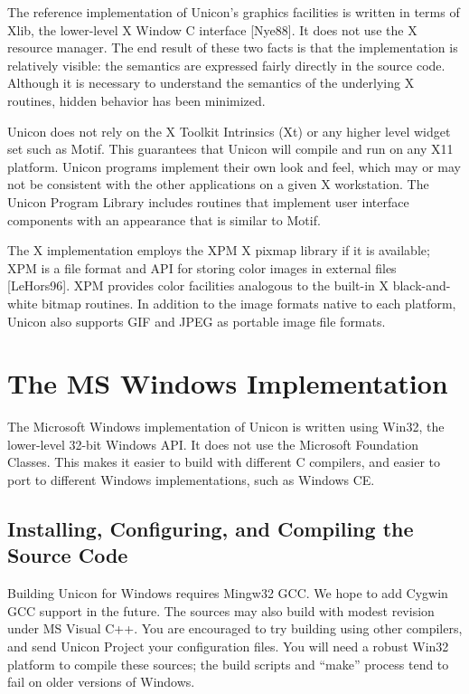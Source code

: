 The reference implementation of Unicon's graphics facilities is
written in terms of Xlib, the lower-level X Window C interface
[Nye88]. It does not use the X resource manager. The end result of
these two facts is that the implementation is relatively visible: the
semantics are expressed fairly directly in the source code. Although
it is necessary to understand the semantics of the underlying X
routines, hidden behavior has been minimized.

Unicon does not rely on the X Toolkit Intrinsics (Xt) or any higher
level widget set such as Motif. This guarantees that Unicon will
compile and run on any X11 platform. Unicon programs implement their
own look and feel, which may or may not be consistent with the other
applications on a given X workstation. The Unicon Program Library
includes routines that implement user interface components with an
appearance that is similar to Motif.

The X implementation employs the XPM X pixmap library if it is
available; XPM is a file format and API for storing color
images in external files [LeHors96]. XPM provides color facilities
analogous to the built-in X black-and-white bitmap routines. In
addition to the image formats native to each platform, Unicon also
supports GIF and JPEG as portable image file formats.

\section{The MS Windows Implementation}

The Microsoft Windows implementation of Unicon is written using Win32,
the lower-level 32-bit Windows API. It does not use the Microsoft
Foundation Classes. This makes it easier to build with different C
compilers, and easier to port to different Windows implementations,
such as Windows CE.

\subsection{Installing, Configuring, and Compiling the Source Code}

Building Unicon for Windows requires Mingw32 GCC. We hope to add
Cygwin GCC support in the future. The sources may also build with
modest revision under MS Visual C++. You are encouraged to try
building using other compilers, and send Unicon Project your
configuration files. You will need a robust Win32 platform to compile
these sources; the build scripts and ``make'' process tend to fail on
older versions of Windows.

